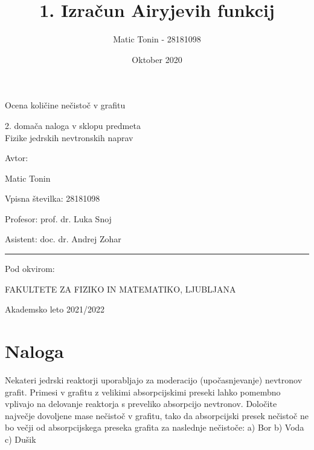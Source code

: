 \documentclass[slovene,11pt,a4paper]{article}
\title{1. Izračun Airyjevih funkcij}
\author{Matic Tonin - 28181098 }
\date{Oktober 2020}
\begin{document}
\begin{center}
\thispagestyle{empty}
\parskip=14pt%
\vspace*{3\parskip}%
\begin{Huge}Ocena količine nečistoč v grafitu\end{Huge}


2. domača naloga v sklopu predmeta \\
Fizike jedrskih nevtronskih naprav

Avtor:

Matic Tonin

Vpisna številka: 28181098

Profesor: prof. dr. Luka Snoj

Asistent: doc. dr. Andrej Zohar


\rule{7cm}{0.4pt}

Pod okvirom:

FAKULTETE ZA FIZIKO IN MATEMATIKO, LJUBLJANA

Akademsko leto 2021/2022


\end{center}
\pagebreak
\section*{Naloga}
Nekateri jedrski reaktorji uporabljajo za moderacijo (upočasnjevanje) nevtronov grafit. Primesi
v grafitu z velikimi absorpcijskimi preseki lahko pomembno vplivajo na delovanje reaktorja s
preveliko absorpcijo nevtronov. Določite največje dovoljene mase nečistoč v grafitu, tako da
absorpcijski presek nečistoč ne bo večji od absorpcijskega preseka grafita za naslednje nečistoče:
a) Bor
b) Voda
c) Dušik
\end{document}

